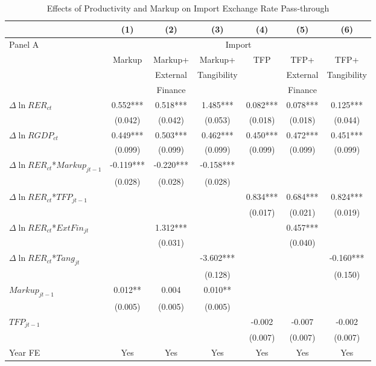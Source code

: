 \begin{table}[htbp]
	\centering
	\caption{Effects of Productivity and Markup on Import Exchange Rate Pass-through}
	\begin{threeparttable}
	\begin{tabular}{lcccccc}
		\midrule          & (1)   & (2)   & (3)   & (4)   & (5)   & (6) \\
		\midrule
		Panel A & \multicolumn{6}{c}{Import} \\
		& Markup & Markup+ & Markup+ & TFP   & TFP+  & TFP+ \\
		&       & External & Tangibility &       & External & Tangibility \\
		&       & Finance &  	&       & Finance &  \\
		\midrule
		$\Delta \ln RER_{ct}$ & 0.552*** & 0.518*** & 1.485*** & 0.082*** & 0.078*** & 0.125*** \\
		& (0.042) & (0.042) & (0.053) & (0.018) & (0.018) & (0.044) \\
		$\Delta \ln RGDP_{ct}$ & 0.449*** & 0.503*** & 0.462*** & 0.450*** & 0.472*** & 0.451*** \\
		& (0.099) & (0.099) & (0.099) & (0.099) & (0.099) & (0.099) \\
		$\Delta \ln RER_{ct}$*$Markup_{jt-1}$ & -0.119*** & -0.220*** & -0.158*** &       &       &  \\
		& (0.028) & (0.028) & (0.028) &       &       &  \\
		$\Delta \ln RER_{ct}$*$TFP_{jt-1}$ &       &       &       & 0.834*** & 0.684*** & 0.824*** \\
		&       &       &       & (0.017) & (0.021) & (0.019) \\
		$\Delta \ln RER_{ct}$*$ExtFin_{jt}$ &       & 1.312*** &       &       & 0.457*** &  \\
		&       & (0.031) &       &       & (0.040) &  \\
		$\Delta \ln RER_{ct}$*$Tang_{jt}$ &       &       & -3.602*** &       &       & -0.160*** \\
		&       &       & (0.128) &       &       & (0.150) \\
		$Markup_{jt-1}$ & 0.012** & 0.004 & 0.010** &  &  &  \\
		& (0.005) & (0.005) & (0.005) &  &  &  \\
		$TFP_{jt-1}$ &  &  &  & -0.002 & -0.007 & -0.002 \\
		&  &  &  & (0.007) & (0.007) & (0.007) \\
		Year FE  & Yes   & Yes   & Yes   & Yes   & Yes   & Yes \\

\end{tabular}
\end{threeparttable}
\end{table}
